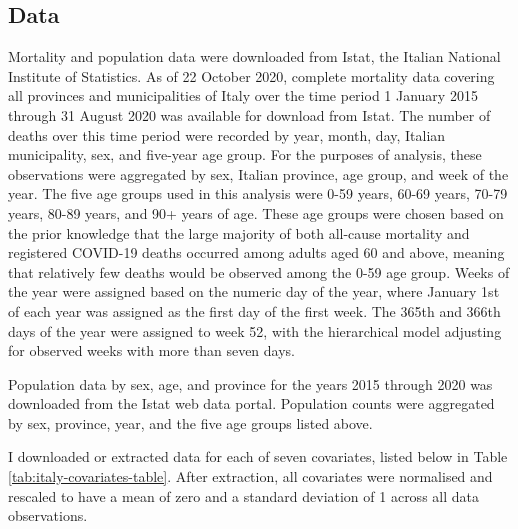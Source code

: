 \documentclass[
]{report}
\begin{document}
\hypertarget{data}{%
\subsection{Data}\label{data}}

Mortality and population data were downloaded from Istat, the Italian National Institute of Statistics. As of 22 October 2020, complete mortality data covering all provinces and municipalities of Italy over the time period 1 January 2015 through 31 August 2020 was available for download from Istat\autocite{ItalianNationalInstituteofStatisticsIstat2020a}. The number of deaths over this time period were recorded by year, month, day, Italian municipality, sex, and five-year age group. For the purposes of analysis, these observations were aggregated by sex, Italian province, age group, and week of the year. The five age groups used in this analysis were 0-59 years, 60-69 years, 70-79 years, 80-89 years, and 90+ years of age. These age groups were chosen based on the prior knowledge that the large majority of both all-cause mortality and registered COVID-19 deaths occurred among adults aged 60 and above, meaning that relatively few deaths would be observed among the 0-59 age group. Weeks of the year were assigned based on the numeric day of the year, where January 1st of each year was assigned as the first day of the first week. The 365th and 366th days of the year were assigned to week 52, with the hierarchical model adjusting for observed weeks with more than seven days.

Population data by sex, age, and province for the years 2015 through 2020 was downloaded from the Istat web data portal\autocite{ItalianNationalInstituteofStatisticsIstat2020}. Population counts were aggregated by sex, province, year, and the five age groups listed above.

I downloaded or extracted data for each of seven covariates, listed below in Table \ref{tab:italy-covariates-table}. After extraction, all covariates were normalised and rescaled to have a mean of zero and a standard deviation of 1 across all data observations.
\end{document}
